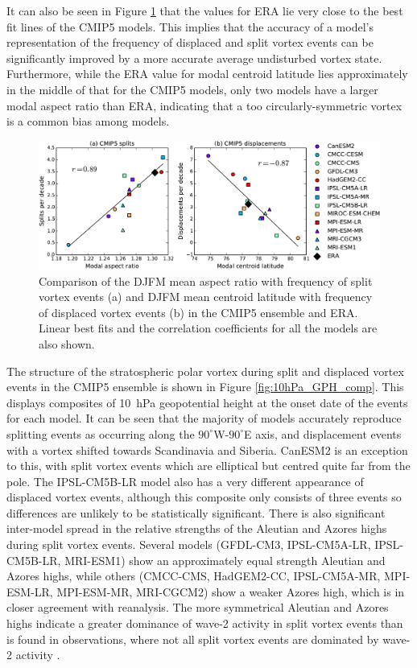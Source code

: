 It can also be seen in Figure \ref{fig:cmip5_moments_scatter} that the values
for ERA lie very close to the best fit lines of the CMIP5 models. This implies
that the accuracy of a model's representation of the frequency of displaced and
split vortex events can be significantly improved by a more accurate average
undisturbed vortex state. Furthermore, while the ERA value for modal centroid
latitude lies approximately in the middle of that for the CMIP5 models, only two
models have a larger modal aspect ratio than ERA, indicating that a too
circularly-symmetric vortex is a common bias among models.

\begin{figure}
 \centering
 \noindent\includegraphics[width=\textwidth]{figures/chapter-models/CMIP5_moments_scatter.pdf}
 \caption[Comparison of moment diagnostics and frequency of split and displaced
 vortex events.]{Comparison of the DJFM mean aspect ratio with frequency of
   split vortex events (a) and DJFM mean centroid latitude with frequency of
   displaced vortex events (b) in the CMIP5 ensemble and ERA. Linear best fits
   and the correlation coefficients for all the models are also shown.}
 \label{fig:cmip5_moments_scatter}
\end{figure}

The structure of the stratospheric polar vortex during split and displaced
vortex events in the CMIP5 ensemble is shown in Figure
\ref{fig:10hPa_GPH_comp}. This displays composites of 10~hPa geopotential height
at the onset date of the events for each model. It can be seen that the majority
of models accurately reproduce splitting events as occurring along the
$90^{\circ}$W-$90^{\circ}$E axis, and displacement events with a vortex shifted
towards Scandinavia and Siberia. CanESM2 is an exception to this, with split
vortex events which are elliptical but centred quite far from the pole. The
IPSL-CM5B-LR model also has a very different appearance of displaced vortex
events, although this composite only consists of three events so differences are
unlikely to be statistically significant. There is also significant inter-model
spread in the relative strengths of the Aleutian and Azores highs during split
vortex events. Several models (GFDL-CM3, IPSL-CM5A-LR, IPSL-CM5B-LR, MRI-ESM1)
show an approximately equal strength Aleutian and Azores highs, while others
(CMCC-CMS, HadGEM2-CC, IPSL-CM5A-MR, MPI-ESM-LR, MPI-ESM-MR, MRI-CGCM2) show a
weaker Azores high, which is in closer agreement with reanalysis. The more
symmetrical Aleutian and Azores highs indicate a greater dominance of wave-2
activity in split vortex events than is found in observations, where not all
split vortex events are dominated by wave-2 activity
\citep{Waugh1997,Mitchell2013}.

